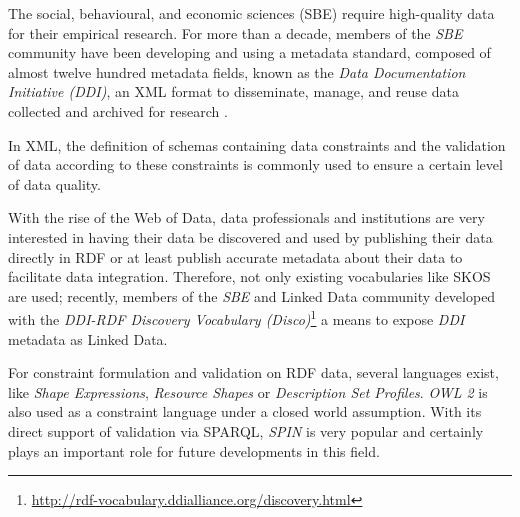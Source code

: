\documentclass{llncs}
\begin{document}

The social, behavioural, and economic sciences (SBE) require high-quality data for their empirical research. For more than a decade, members of the \emph{SBE} community have been developing and using a
metadata standard, composed of almost twelve hundred metadata fields, known as the \emph{Data Documentation Initiative (DDI)},
an XML format to disseminate, manage,
and reuse data collected and archived for research \cite{Vardigan2008}. 

In XML, the definition of schemas containing data constraints and the validation of data according to these constraints is commonly used to ensure a certain level of data quality.

With the rise of the Web of Data, data professionals and institutions are very interested in having their data be discovered and used by publishing their data directly in RDF or at least publish accurate metadata about their data to facilitate data integration. Therefore, not only existing vocabularies like SKOS are used; 
recently, members of the \emph{SBE} and Linked Data community developed with the \emph{DDI-RDF Discovery Vocabulary (Disco)}\footnote{\url{http://rdf-vocabulary.ddialliance.org/discovery.html}} a means to expose \emph{DDI} metadata as Linked Data. 

For constraint formulation and validation on RDF data, several languages exist, like \emph{Shape Expressions}, \emph{Resource Shapes} or \emph{Description Set Profiles}. \emph{OWL 2} is also used as a constraint language under a closed world assumption. With its direct support of validation via SPARQL, \emph{SPIN}%
is very popular and certainly plays an important role for future developments in this field.
\end{document}
